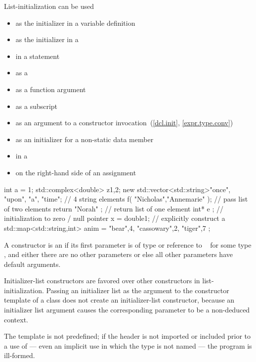 \begin{note}
List-initialization can be used
\begin{itemize}
\item as the initializer in a variable definition
\item as the initializer in a 
\item in a  statement
\item as a 
\item as a function argument
\item as a subscript
\item as an argument to a constructor invocation~(\ref{dcl.init}, \ref{expr.type.conv})
\item as an initializer for a non-static data member
\item in a 
\item on the right-hand side of an assignment
\end{itemize}

\begin{example}
\begin{codeblock}
int a = {1};
std::complex<double> z{1,2};
new std::vector<std::string>{"once", "upon", "a", "time"};  // 4 string elements
f( {"Nicholas","Annemarie"} );  // pass list of two elements
return { "Norah" };             // return list of one element
int* e {};                      // initialization to zero / null pointer
x = double{1};                  // explicitly construct a 
std::map<std::string,int> anim = { {"bear",4}, {"cassowary",2}, {"tiger",7} };
\end{codeblock}
\end{example}
\end{note}

\pnum
A constructor is an  if its first parameter is
of type  or reference to
\cv{}~ for some type , and either there are no other
parameters or else all other parameters have default arguments.
\begin{note}
Initializer-list constructors are favored over other constructors in
list-initialization. Passing an initializer list as the argument
to the constructor template  of a class  does not
create an initializer-list constructor, because an initializer list argument causes the
corresponding parameter to be a non-deduced context.
\end{note}
The template
 is not predefined; if the header
 is not imported or included prior to a use of
 --- even an implicit use in which the type is not
named --- the program is ill-formed.

